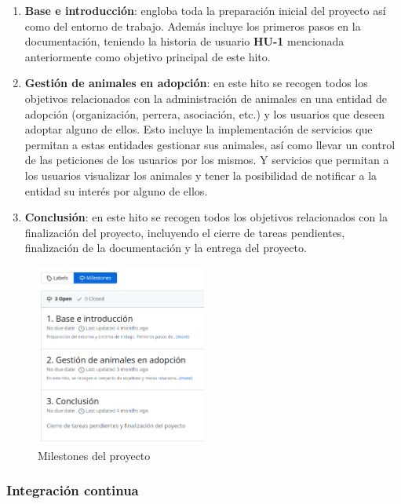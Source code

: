 \begin{enumerate}
    \item \textbf{Base e introducción}: engloba toda la preparación inicial del proyecto así como del entorno de
    trabajo. Además incluye los primeros pasos en la documentación, teniendo la historia de usuario \textbf{HU-1}
    mencionada anteriormente como objetivo principal de este hito.
    \item \textbf{Gestión de animales en adopción}: en este hito se recogen todos los objetivos relacionados con
    la administración de animales en una entidad de adopción (organización, perrera, asociación, etc.) y los
    usuarios que deseen adoptar alguno de ellos. Esto incluye
    la implementación de servicios que permitan a estas entidades gestionar sus animales, así como llevar un control
    de las peticiones de los usuarios por los mismos. Y servicios que permitan a los usuarios
    visualizar los animales y tener la posibilidad de notificar a la entidad su interés por alguno de ellos.
    \item \textbf{Conclusión}: en este hito se recogen todos los objetivos relacionados con la finalización del
    proyecto, incluyendo el cierre de tareas pendientes, finalización de la documentación y la entrega del proyecto.
\end{enumerate}

\begin{figure}[H]
    \centering
    \includegraphics[width=0.5\textwidth]{imgs/milestones.png}
    \caption{Milestones del proyecto}
    \label{fig:milestones}
\end{figure}


\subsubsection{Integración continua}

